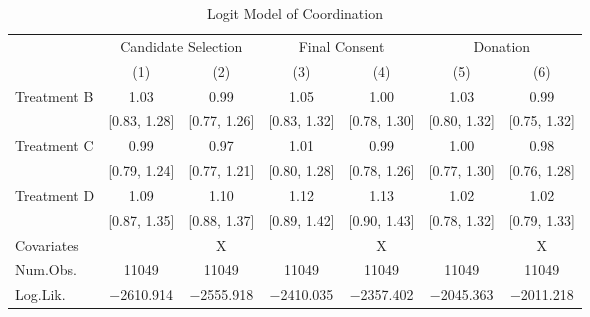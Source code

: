 \documentclass[12pt, a4paper]{article}
\begin{document}
\begin{landscape}\begin{table}[H]

\caption{\label{tab:coordinate-logit}Logit Model of Coordination}
\centering
\fontsize{8}{10}\selectfont
\begin{threeparttable}
\begin{tabular}[t]{lcccccc}
\toprule
\multicolumn{1}{c}{ } & \multicolumn{2}{c}{Candidate Selection} & \multicolumn{2}{c}{Final Consent} & \multicolumn{2}{c}{Donation} \\
\cmidrule(l{3pt}r{3pt}){2-3} \cmidrule(l{3pt}r{3pt}){4-5} \cmidrule(l{3pt}r{3pt}){6-7}
  & (1) & (2) & (3) & (4) & (5) & (6)\\
\midrule
Treatment B & \num{1.03} & \num{0.99} & \num{1.05} & \num{1.00} & \num{1.03} & \num{0.99}\\
 & {}[\num{0.83}, \num{1.28}] & {}[\num{0.77}, \num{1.26}] & {}[\num{0.83}, \num{1.32}] & {}[\num{0.78}, \num{1.30}] & {}[\num{0.80}, \num{1.32}] & {}[\num{0.75}, \num{1.32}]\\
Treatment C & \num{0.99} & \num{0.97} & \num{1.01} & \num{0.99} & \num{1.00} & \num{0.98}\\
 & {}[\num{0.79}, \num{1.24}] & {}[\num{0.77}, \num{1.21}] & {}[\num{0.80}, \num{1.28}] & {}[\num{0.78}, \num{1.26}] & {}[\num{0.77}, \num{1.30}] & {}[\num{0.76}, \num{1.28}]\\
Treatment D & \num{1.09} & \num{1.10} & \num{1.12} & \num{1.13} & \num{1.02} & \num{1.02}\\
 & {}[\num{0.87}, \num{1.35}] & {}[\num{0.88}, \num{1.37}] & {}[\num{0.89}, \num{1.42}] & {}[\num{0.90}, \num{1.43}] & {}[\num{0.78}, \num{1.32}] & {}[\num{0.79}, \num{1.33}]\\
\midrule
Covariates &  & X &  & X &  & X\\
Num.Obs. & \num{11049} & \num{11049} & \num{11049} & \num{11049} & \num{11049} & \num{11049}\\
Log.Lik. & \num{-2610.914} & \num{-2555.918} & \num{-2410.035} & \num{-2357.402} & \num{-2045.363} & \num{-2011.218}\\
\bottomrule
\end{tabular}
\begin{tablenotes}

\end{tablenotes}
\end{threeparttable}
\end{table}
\end{landscape}
\end{document}

